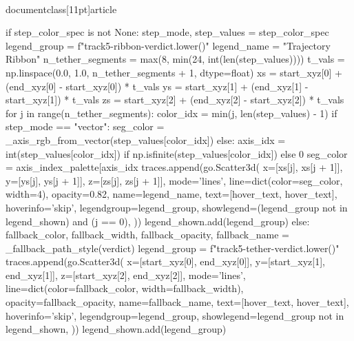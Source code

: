\\documentclass[11pt]{article}
\begin{document}
\begin{CodeBlock}
{{            if step_color_spec is not None:
                step_mode, step_values = step_color_spec
                legend_group = f"track5-ribbon-{verdict.lower()}"
                legend_name = "Trajectory Ribbon"
                n_tether_segments = max(8, min(24, int(len(step_values))))
                t_vals = np.linspace(0.0, 1.0, n_tether_segments + 1, dtype=float)
                xs = start_xyz[0] + (end_xyz[0] - start_xyz[0]) * t_vals
                ys = start_xyz[1] + (end_xyz[1] - start_xyz[1]) * t_vals
                zs = start_xyz[2] + (end_xyz[2] - start_xyz[2]) * t_vals
                for j in range(n_tether_segments):
                    color_idx = min(j, len(step_values) - 1)
                    if step_mode == "vector":
                        seg_color = _axis_rgb_from_vector(step_values[color_idx])
                    else:
                        axis_idx = int(step_values[color_idx]) if np.isfinite(step_values[color_idx]) else 0
                        seg_color = axis_index_palette[axis_idx %
                    traces.append(go.Scatter3d(
                        x=[xs[j], xs[j + 1]],
                        y=[ys[j], ys[j + 1]],
                        z=[zs[j], zs[j + 1]],
                        mode='lines',
                        line=dict(color=seg_color, width=4),
                        opacity=0.82,
                        name=legend_name,
                        text=[hover_text, hover_text],
                        hoverinfo='skip',
                        legendgroup=legend_group,
                        showlegend=(legend_group not in legend_shown) and (j == 0),
                    ))
                legend_shown.add(legend_group)
            else:
                fallback_color, fallback_width, fallback_opacity, fallback_name = _fallback_path_style(verdict)
                legend_group = f"track5-tether-{verdict.lower()}"
                traces.append(go.Scatter3d(
                    x=[start_xyz[0], end_xyz[0]],
                    y=[start_xyz[1], end_xyz[1]],
                    z=[start_xyz[2], end_xyz[2]],
                    mode='lines',
                    line=dict(color=fallback_color, width=fallback_width),
                    opacity=fallback_opacity,
                    name=fallback_name,
                    text=[hover_text, hover_text],
                    hoverinfo='skip',
                    legendgroup=legend_group,
                    showlegend=legend_group not in legend_shown,
                ))
                legend_shown.add(legend_group)

}}
\end{CodeBlock}
\end{document}
